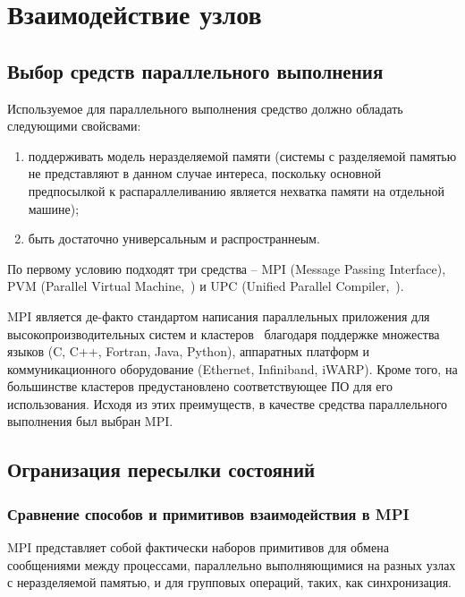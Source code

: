 \chapter{Взаимодействие узлов}
\label{cha:communication}

\section{Выбор средств параллельного выполнения}
\label{sec:parall-selection}

Используемое для параллельного выполнения средство должно обладать следующими свойсвами:
\begin{enumerate}
\item поддерживать модель неразделяемой памяти (системы с разделяемой памятью не
  представляют в данном случае интереса, поскольку основной предпосылкой к
  распараллеливанию является нехватка памяти на отдельной машине);
\item быть достаточно универсальным и распространнеым.
\end{enumerate}

По первому условию подходят три средства -- MPI (Message Passing Interface), PVM (Parallel
Virtual Machine,~\cite{PVM}) и UPC (Unified Parallel Compiler,~\cite{UPC12}).

MPI является де-факто стандартом написания параллельных приложения для
высокопроизводительных систем и кластеров~\cite{MPI} благодаря поддержке множества языков
(C, C++, Fortran, Java, Python\etc), аппаратных платформ и коммуникационного оборудование
(Ethernet, Infiniband, iWARP\etc). Кроме того, на большинстве кластеров предустановлено
соответствующее ПО для его использования. Исходя из этих преимуществ, в качестве средства
параллельного выполнения был выбран MPI.

\section{Огранизация пересылки состояний}
\label{sec:mpi-interaction}

\subsection{Сравнение способов и примитивов взаимодействия в MPI}
\label{sec:mpi-primitives}

MPI представляет собой фактически наборов примитивов для обмена сообщениями между
процессами, параллельно выполняющимися на разных узлах с неразделяемой памятью, и для
групповых операций, таких, как синхронизация.

